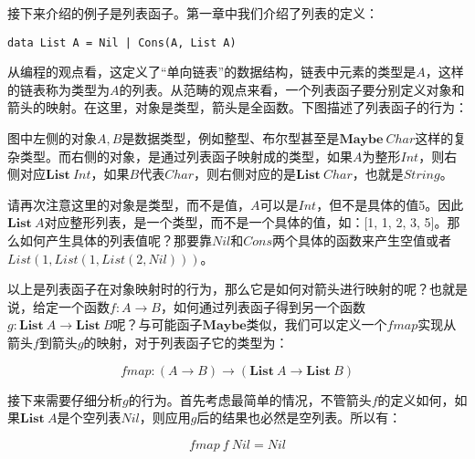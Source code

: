 \documentclass{article}
\begin{document}
\begin{example}
接下来介绍的例子是列表函子。第一章中我们介绍了列表的定义：

\lstset{frame=none}
\begin{lstlisting}
data List A = Nil | Cons(A, List A)
\end{lstlisting}

从编程的观点看，这定义了“单向链表”的数据结构，链表中元素的类型是$A$，这样的链表称为类型为$A$的列表。从范畴的观点来看，一个列表函子要分别定义对象和箭头的映射。在这里，对象是类型，箭头是全函数。下图描述了列表函子的行为：

\begin{center}
\end{center}

图中左侧的对象$A, B$是数据类型，例如整型、布尔型甚至是$\mathbf{Maybe}\ Char$这样的复杂类型。而右侧的对象，是通过列表函子映射成的类型，如果$A$为整形$Int$，则右侧对应$\mathbf{List}\ Int$，如果$B$代表$Char$，则右侧对应的是$\mathbf{List}\ Char$，也就是$String$。

请再次注意这里的对象是类型，而不是值，$A$可以是$Int$，但不是具体的值5。因此$\mathbf{List}\ A$对应整形列表，是一个类型，而不是一个具体的值，如：[1, 1, 2, 3, 5]。那么如何产生具体的列表值呢？那要靠$Nil$和$Cons$两个具体的函数来产生空值或者$List(1, List(1, List(2, Nil)))$。

以上是列表函子在对象映射时的行为，那么它是如何对箭头进行映射的呢？也就是说，给定一个函数$f: A \to B$，如何通过列表函子得到另一个函数$g: \mathbf{List}\ A \to \mathbf{List}\ B$呢？与可能函子$\mathbf{Maybe}$类似，我们可以定义一个$fmap$实现从箭头$f$到箭头$g$的映射，对于列表函子它的类型为：

\[
fmap: (A \to B) \to (\mathbf{List}\ A \to \mathbf{List}\ B)
\]

接下来需要仔细分析$g$的行为。首先考虑最简单的情况，不管箭头$f$的定义如何，如果$\mathbf{List}\ A$是个空列表$Nil$，则应用$g$后的结果也必然是空列表。所以有：

\[
fmap\ f\ Nil = Nil
\]


\end{example}
\end{document}
